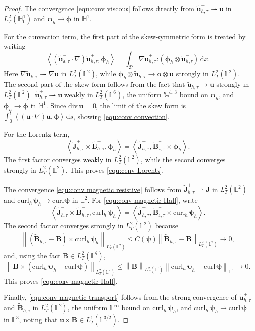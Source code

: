 \documentclass[11pt, reqno]{amsart}
\theoremstyle{definition}
\numberwithin{equation}{section}
\newcommand{\curl}{\mathrm{curl}\,}
\newcommand{\divg}{\mathrm{div}\,}
\newcommand{\bff}{\boldsymbol}
\newcommand{\bb}{\mathbb}
\newcommand{\dx}{\,\mathrm{d}x}
\newcommand{\ds}{\,\mathrm{d}s}
\newcommand{\norm}[2]{\left\|{#1}\right\|_{#2}}
\newcommand{\inpro}[2]{\left\langle#1,#2\right\rangle}
\newcommand{\curlh}{\mathrm{curl}_h\,}
\begin{document}
\begin{proof}
	The convergence \eqref{equ:conv viscous} follows directly from
	$\widetilde{\bff u}_{h,\tau}^{+}\rightharpoonup\bff u$ in
	$L^2_T(\bb H_0^1)$ and $\bff\phi_h\to\bff\phi$ in $\bb H^1$.
	
	For the convection term, the first part of the skew-symmetric form is treated by
	writing
	\[
	\inpro{(\widetilde{\bff u}_{h,\tau}^{-}\cdot\nabla)
		\widetilde{\bff u}_{h,\tau}^{+}}{\bff\phi_h}
	=
	\int_{\mathscr D}
	\nabla\widetilde{\bff u}_{h,\tau}^{+}:
	(\bff\phi_h \otimes \widetilde{\bff u}_{h,\tau}^{-})\dx .
	\]
	Here $\nabla\widetilde{\bff u}_{h,\tau}^{+}\rightharpoonup\nabla\bff u$
	in $L^2_T(\bb L^2)$, while
	$\bff\phi_h \otimes \widetilde{\bff u}_{h,\tau}^{-} 
	\to \bff\phi \otimes \bff u$ strongly in $L^2_T(\bb L^2)$. The second part of the skew form follows from the fact that
	$\widetilde{\bff u}_{h,\tau}^{-}\to\bff u$ strongly in
	$L^2_T(\bb L^2)$,
	$\widetilde{\bff u}_{h,\tau}^{+}\rightharpoonup\bff u$ weakly in
	$L^2_T(\bb L^6)$, the uniform $\bb W^{1,3}$ bound on $\bff\phi_h$,
	and $\bff\phi_h\to\bff\phi$ in $\bb H^1$. Since $\divg\bff u=0$, the
	limit of the skew form is
	$\int_0^t\inpro{(\bff u\cdot\nabla)\bff u}{\bff\phi}\ds$, showing \eqref{equ:conv convection}.
	
	For the Lorentz term,
	\[
	\inpro{\widetilde{\bff J}_{h,\tau}^{+}
		\times\widetilde{\bff B}_{h,\tau}^{-}}{\bff\phi_h}
	=
	\inpro{\widetilde{\bff J}_{h,\tau}^{+}}
	{\widetilde{\bff B}_{h,\tau}^{-}\times\bff\phi_h}.
	\]
	The first factor converges weakly in $L^2_T(\bb L^2)$, while the second
	converges strongly in $L^2_T(\bb L^2)$. This proves
	\eqref{equ:conv Lorentz}.
	
	The convergence \eqref{equ:conv magnetic resistive} follows from
	$\widetilde{\bff J}_{h,\tau}^{+}\rightharpoonup\bff J$ in
	$L^2_T(\bb L^2)$ and
	$\curlh\bff\psi_h\to\curl\bff\psi$ in $\bb L^2$. For
	\eqref{equ:conv magnetic Hall}, write
	\[
	\inpro{\widetilde{\bff J}_{h,\tau}^{+}
		\times\widetilde{\bff B}_{h,\tau}^{-}}{\curlh\bff\psi_h}
	=
	\inpro{\widetilde{\bff J}_{h,\tau}^{+}}
	{\widetilde{\bff B}_{h,\tau}^{-}\times\curlh\bff\psi_h}.
	\]
	The second factor converges strongly in $L^2_T(\bb L^2)$ because
	\[
	\norm{(\widetilde{\bff B}_{h,\tau}^{-}-\bff B)
		\times\curlh\bff\psi_h}{L^2_T(\bb L^2)}
	\le
	C(\bff\psi)
	\norm{\widetilde{\bff B}_{h,\tau}^{-}-\bff B}{L^2_T(\bb L^2)}
	\to0,
	\]
	and, using the fact $\bff B\in L^2_T(\bb L^6)$,
	\[
	\norm{\bff B\times(\curlh\bff\psi_h-\curl\bff\psi)}
	{L^2_T(\bb L^2)}
	\le
	\norm{\bff B}{L^2_T(\bb L^6)}
	\norm{\curlh\bff\psi_h-\curl\bff\psi}{\bb L^3}
	\to0.
	\]
	This proves \eqref{equ:conv magnetic Hall}. 
	
	Finally, \eqref{equ:conv magnetic transport} follows from the strong
	convergence of $\widetilde{\bff u}_{h,\tau}^{+}$ and
	$\widetilde{\bff B}_{h,\tau}^{-}$ in $L^2_T(\bb L^2)$, the uniform
	$\bb L^\infty$ bound on $\curlh\bff\psi_h$, and
	$\curlh\bff\psi_h\to\curl\bff\psi$ in $\bb L^3$, noting that
	$\bff u\times\bff B\in L^1_T(\bb L^{3/2})$.
\end{proof}
\end{document}

